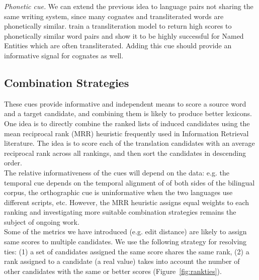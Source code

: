 \documentclass{article}
\newcommand{\figref}[1]{Figure~\ref{#1}}
\begin{document}
\noindent\emph{Phonetic cue.}  We can extend the previous idea to language pairs not sharing the same writing system, since many cognates and transliterated words are phonetically similar.  \cite{Klementiev:2006b} train a transliteration model to return high scores to phonetically similar word pairs and show it to be highly successful for Named Entities which are often transliterated.  Adding this cue should provide an informative signal for cognates as well. \\


\subsection{Combination Strategies}

These cues provide informative and independent means to score a source word and a target candidate, and combining them is likely to produce better lexicons.  One idea is to directly combine the ranked lists of induced candidates using the mean reciprocal rank (MRR) heuristic frequently used in Information Retrieval literature.  The idea is to score each of the translation candidates with an average reciprocal rank across all rankings, and then sort the candidates in descending order.\\

The relative informativeness of the cues will depend on the data: e.g. the temporal cue depends on the temporal alignment of of both sides of the bilingual corpus, the orthographic cue is uninformative when the two languages use different scripts, etc.  However, the MRR heuristic assigns equal weights to each ranking and investigating more suitable combination strategies remains the subject of ongoing work.\\ 

Some of the metrics we have introduced (e.g. edit distance) are likely to assign same scores to multiple candidates.  We use the following strategy for resolving ties: (1) a set of candidates assigned the same score shares the same rank, (2) a rank assigned to a candidate (a real value) takes into account the number of other candidates with the same or better scores (\figref{fig:rankties}).\\
\end{document}
